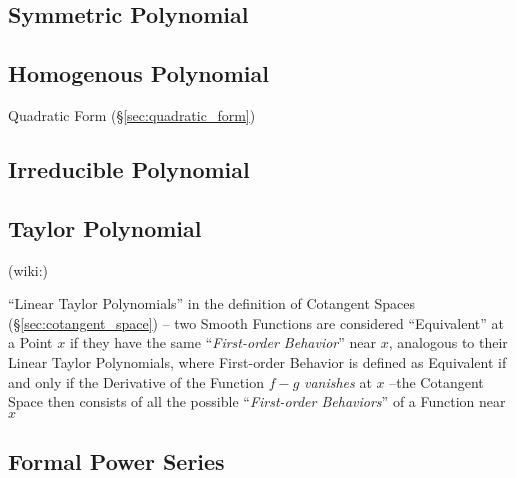 \subsection{Symmetric Polynomial}\label{sec:symmetric_polynomial}

\subsection{Homogenous Polynomial}\label{sec:homogenous_polynomial}

Quadratic Form (\S\ref{sec:quadratic_form})



\subsection{Irreducible Polynomial}\label{sec:irreducible_polynomial}

\subsection{Taylor Polynomial}\label{sec:taylor_polynomial}

(wiki:)

``Linear Taylor Polynomials'' in the definition of Cotangent Spaces
(\S\ref{sec:cotangent_space}) -- two Smooth Functions are considered
``Equivalent'' at a Point $x$ if they have the same ``\emph{First-order
  Behavior}'' near $x$, analogous to their Linear Taylor Polynomials,
where First-order Behavior is defined as Equivalent if and only if the
Derivative of the Function $f-g$ \emph{vanishes} at $x$ --the Cotangent Space
then consists of all the possible ``\emph{First-order Behaviors}'' of a
Function near $x$



\subsection{Formal Power Series}\label{sec:formal_power_series}

